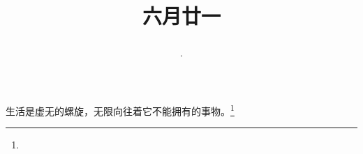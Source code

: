 \title{\date[d=26,m=7,y=2024][year:cn-y,年,month:cn,day:cn,日,·,weekday]·六月廿一 }
生活是虚无的螺旋，无限向往着它不能拥有的事物。\footnote{ }

